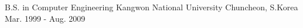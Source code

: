 

\begin{cventries}

  \cventry
    {B.S. in Computer Engineering} %
    {Kangwon National University} %
    {Chuncheon, S.Korea} %
    {Mar. 1999 - Aug. 2009} %
    {
      \begin{cvitems} %
      \end{cvitems}
    }

\end{cventries}
